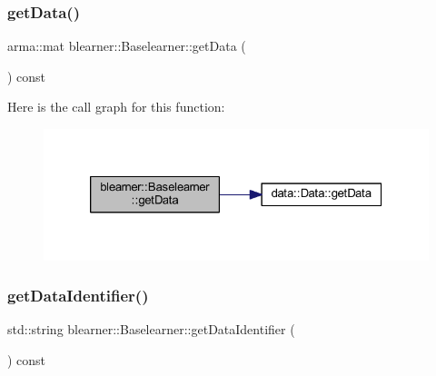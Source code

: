 \subsubsection{\texorpdfstring{get\+Data()}{getData()}}
{\footnotesize\ttfamily arma\+::mat blearner\+::\+Baselearner\+::get\+Data (\begin{DoxyParamCaption}{ }\end{DoxyParamCaption}) const}

Here is the call graph for this function\+:
\nopagebreak
\begin{figure}[H]
\begin{center}
\leavevmode
\includegraphics[width=326pt]{classblearner_1_1_baselearner_af3a360bb039447610e9928956384c05d_cgraph}
\end{center}
\end{figure}
\mbox{\label{classblearner_1_1_baselearner_a2393dc1e3cf90919ebbbd237fe303860}} 
\subsubsection{\texorpdfstring{get\+Data\+Identifier()}{getDataIdentifier()}}
{\footnotesize\ttfamily std\+::string blearner\+::\+Baselearner\+::get\+Data\+Identifier (\begin{DoxyParamCaption}{ }\end{DoxyParamCaption}) const}

